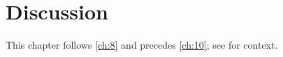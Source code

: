 \chapter{Discussion}\label{ch:9}
\lipsum[126-128]

This chapter follows \cref{ch:8} and precedes \cref{ch:10}; see \citep{main-1,main-3} for context.
